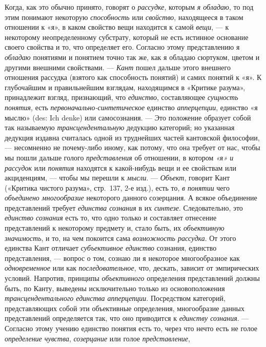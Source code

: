 \documentclass[twoside]{article}
\begin{document}
{{Когда, как это обычно принято, говорят о {\em рассудке}, которым {\em я обладаю}, 
то под этим понимают некоторую {\em способность} или {\em свойство}, находящееся 
в таком отношении к «я», в каком свойство вещи находится к самой {\em вещи}, —
к некоторому неопределенному субстрату, который не есть истинное основание 
своего свойства и то, что определяет его. Согласно этому представлению я 
{\em обладаю} понятиями и понятием точно так же, как я обладаю сюртуком, 
цветом и другими внешними свойствами. — {\em Кант} пошел дальше этого 
внешнего отношения рассудка (взятого как способность понятий) и самих 
понятий к «я». К глубочайшим и правильнейшим взглядам, находящимся в 
«Критике разума», принадлежит взгляд, признающий, что {\em единство}, 
составляющее {\em сущность понятия}, есть {\em первоначально-синтетическое}
единство {\em апперцепции}, единство «я мыслю» (des: Ich denke) или самосознания. —
Это положение образует собой так называемую {\em трансцендентальную} дедукцию 
категорий; но указанная дедукция издавна считалась одной из труднейших 
частей кантовской философии, — несомненно не почему-либо иному, как потому, 
что она требует от нас, чтобы мы пошли дальше голого {\em представления} об
отношении, в котором {\em «я» и рассудок} или {\em понятия} находятся к
какой-нибудь вещи и ее свойствам или акциденциям, — чтобы мы перешли к 
{\em мысли}. — {\em Объект}, говорит Кант («Критика чистого разума», 
стр.~137, 2-е изд.), есть то, {\em в понятии} чего {\em объединено многообразие}
некоторого данного созерцания. А всякое объединение представлений требует 
{\em единства сознания} в их {\em синтезе}. Следовательно, это {\em единство сознания}
есть то, что одно только и составляет отнесение представлений к некоторому 
предмету и, стало быть, их {\em объективную значимость}, и то, на чем покоится 
сама {\em возможность рассудка}. От этого единства Кант отличает 
{\em субъективное единство} сознания, единство представления, — вопрос о том, 
сознаю ли я некоторое многообразное как {\em одновременное} или как 
{\em последовательное}, что, дескать, зависит от эмпирических условий. 
Напротив, принципы {\em объективного} определения представлений должны быть, 
по Канту, выведены исключительно только из основоположения 
{\em трансцендентального единства апперцепции}. Посредством категорий, 
представляющих собой эти объективные определения, многообразие данных 
представлений определяется так, что оно приводится к {\em единству сознания}. 
— Согласно этому учению единство понятия есть то, через что нечто есть не 
голое {\em определение чувства}, {\em созерцание} или голое {\em представление}, 
}}
\end{document}
